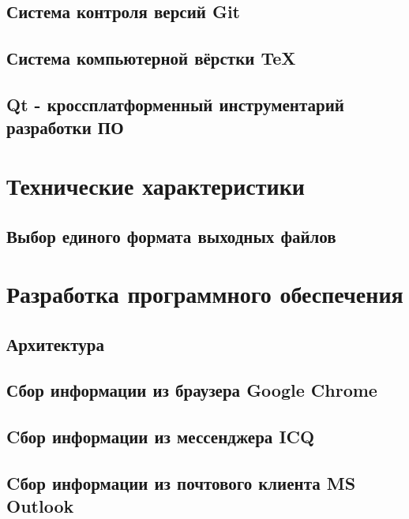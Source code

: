 \subsection{Система контроля версий Git}

\subsection{Система компьютерной вёрстки \TeX}

\subsection{Qt - кроссплатформенный инструментарий разработки ПО}


\section{Технические характеристики}

\subsection{Выбор единого формата выходных файлов}


\section{Разработка программного обеспечения}
\setcounter{figure}{0}
 
\subsection{Архитектура}


\newpage
\subsection{Сбор информации из браузера Google Chrome} %


\newpage
\subsection{Cбор информации из мессенджера ICQ} %


\newpage
\subsection{Cбор информации из почтового клиента MS Outlook} %


